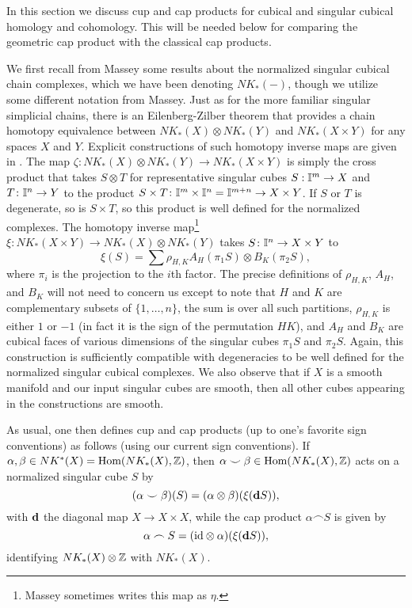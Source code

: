 In this section we discuss cup and cap products for cubical and singular cubical homology and cohomology.
This will be needed below for comparing the geometric cap product with the classical cap products.

We first recall from Massey \cite[Chapter XI]{Mas91} some results about the normalized singular cubical chain complexes, which we have been denoting $NK_*(-)$, though we utilize some different notation from Massey.
Just as for the more familiar singular simplicial chains, there is an Eilenberg-Zilber theorem that provides a chain homotopy equivalence between $NK_*(X) \otimes NK_*(Y)$ and $NK_*(X \times Y)$ for any spaces $X$ and $Y$.
Explicit constructions of such homotopy inverse maps are given in \cite[Section XI.5]{Mas91}.
The map $\zeta: NK_*(X) \otimes NK_*(Y) \to NK_*(X \times Y)$ is simply the cross product that takes $S \otimes T$ for representative singular cubes $S: \mathbb{I}^m \to X$ and $T \colon \mathbb{I}^n \to Y$ to the product $S \times T \colon \mathbb{I}^m \times \mathbb{I}^n = \mathbb{I}^{m+n} \to X \times Y$.
If $S$ or $T$ is degenerate, so is $S \times T$, so this product is well defined for the normalized complexes.
The homotopy inverse map\footnote{Massey sometimes writes this map as $\eta$.} $\xi: NK_*(X \times Y) \to NK_*(X) \otimes NK_*(Y)$ takes $S \colon \mathbb{I}^n \to X \times Y$ to
$$\xi(S) = \sum \rho_{H,K}A_H(\pi_1S) \otimes B_K(\pi_2S),$$ where $\pi_i$ is the projection to the $i$th factor.
The precise definitions of $\rho_{H,K}$, $A_H$, and $B_K$ will not need to concern us except to note that $H$ and $K$ are complementary subsets of $\{1,\ldots, n\}$, the sum is over all such partitions, $\rho_{H,K}$ is either $1$ or $-1$ (in fact it is the sign of the permutation $HK$), and $A_H$ and $B_K$ are cubical faces of various dimensions of the singular cubes $\pi_1S$ and $\pi_2S$.
Again, this construction is sufficiently compatible with degeneracies to be well defined for the normalized singular cubical complexes.
We also observe that if $X$ is a smooth manifold and our input singular cubes are smooth, then all other cubes appearing in the constructions are smooth.

As usual, one then defines cup and cap products (up to one's favorite sign conventions) as follows (using our current sign conventions).
If $\alpha, \beta \in NK^*(X) = \textup{Hom}(NK_*(X),\mathbb{Z})$, then $\alpha\smile \beta \in \textup{Hom}(NK_*(X),\mathbb{Z})$ acts on a normalized singular cube $S$ by
\begin{equation}\label{E: cubical cup}
	(\alpha \smile \beta)(S) = (\alpha \otimes \beta)(\xi(\mathbf{d} S)),
\end{equation}
with $\mathbf{d}$ the diagonal map $X \to X \times X$,
while the cap product $\alpha\frown S$ is given by
\begin{equation}\label{E: cubical cap}
	\alpha\frown S = (\mathrm{id} \otimes \alpha) (\xi(\mathbf{d} S)),
\end{equation}
identifying $NK_*(X) \otimes \mathbb{Z}$ with $NK_*(X)$.


